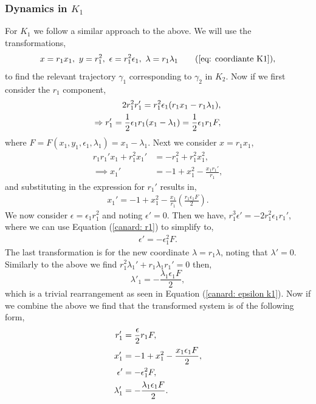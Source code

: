 \subsubsection{Dynamics in \texorpdfstring{$K_1$}{K1}}\label{sec:dynamics-in-texorpdfstringk1k1}
For $K_1$ we follow a similar approach to the above. We will use the transformations, 
\begin{equation}
x=r_1x_1, \ y=r_1^2, \ \epsilon=r_1^2\epsilon_1, \ \lambda=r_1\lambda_1 \tag{\ref{eq: coordiante K1}},
\end{equation}
to find the relevant trajectory $\gamma_1$ corresponding to $\gamma_2$ in $K_2$. Now if we first consider the $r_1$ component, 
\begin{align}
2r_1^2r_1'=r_1^2\epsilon_1(r_1x_1-r_1\lambda_1),\notag\\ \label{canard: r1}
\Rightarrow r_1' = \frac{1}{2} \epsilon_1r_1 (x_1 - \lambda_1) = \frac{1}{2} \epsilon_1r_1F,
\end{align}
where $F=F(x_1,y_1,\epsilon_1,\lambda_1)=x_1-\lambda_1$. Next we consider $x=r_1x_1$,
\begin{align*}
r_1r_1'x_1+r_1^2x_1'&=-r_1^2+r_1^2x_1^2,\\
\implies x_1'&=-1+x_1^2-\frac{x_1r_1'}{r_1},
\end{align*}
and substituting in the expression for $r_1'$ results in,
\begin{align}
x_1'=-1+x_1^2-\frac{x_1}{r_1}\left(\frac{r_1\epsilon_1F}{2}\right). \label{eq: canard x1}
\end{align}
We now consider $\epsilon=\epsilon_1r_1^2$ and noting $\epsilon'=0$. Then we have, $r_1^3\epsilon'=-2r_1^2\epsilon_1r_1'$, where we can use Equation (\ref{canard: r1}) to simplify to,
\begin{align}
\epsilon'=-\epsilon_1^2F. \label{canard: epsilon k1}
\end{align}
The last transformation is for the new coordinate $\lambda=r_1\lambda$, noting that $\lambda'=0$. Similarly to the above we find $r_1^2\lambda_1'+r_1\lambda_1r_1'=0$ then, 
\begin{equation}
\lambda'_1=-\frac{\lambda_1\epsilon_1F}{2}, 
\end{equation}
which is a trivial rearrangement as seen in Equation (\ref{canard: epsilon k1}). Now if we combine the above we find that the transformed system is of the following form,
\begin{subequations}
	\begin{align}
	r_1'&=\frac{\epsilon}{2}r_1F, \\ \notag
	x_1'&=-1+x_1^2-\frac{x_1\epsilon_1F}{2},\\
	\epsilon'&=-\epsilon_1^2F,\\ \notag
	\lambda'_1&=-\frac{\lambda_1\epsilon_1F}{2}. \notag
	\end{align}
	\label{canard: system of equations}
\end{subequations}

